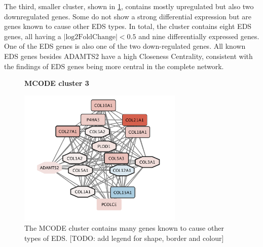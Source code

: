 The third, smaller cluster, shown in \ref{fig:mcode3}, contains mostly upregulated but also two downregulated genes. Some do not show a strong differential expression but are genes known to cause other EDS types. In total, the cluster contains eight EDS genes, all having a $|\text{log2FoldChange}| < 0.5$ and nine differentially expressed genes. One of the EDS genes is also one of the two down-regulated genes. All known EDS genes besides ADAMTS2 have a high Closeness Centrality, consistent with the findings of EDS genes being more central in the complete network.

\begin{figure}[htb!]
	\centering
	\caption*{\textbf{MCODE cluster 3}}
	\includegraphics[width=0.7\textwidth]{fig/MCODE-cluster3.png}
	\caption[MCODE cluster 3]{\centering The MCODE cluster contains many genes known to cause other types of EDS. [TODO: add legend for shape, border and colour]}
	\label{fig:mcode3}
\end{figure}


